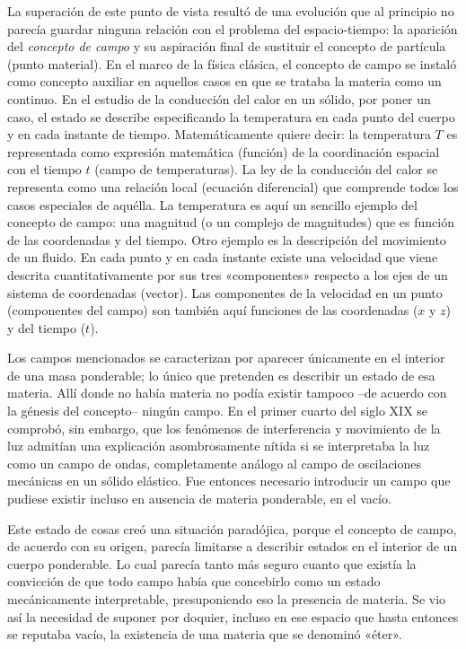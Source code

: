 \documentclass[spanish]{book}
\begin{document}
La superación de este punto de vista resultó de una evolución que al principio no
parecía guardar ninguna relación con el problema del espacio-tiempo: la aparición del
\textit{concepto de campo} y su aspiración final de sustituir el concepto de partícula (punto
material). En el marco de la física clásica, el concepto de campo se instaló como
concepto auxiliar en aquellos casos en que se trataba la materia como un continuo.
En el estudio de la conducción del calor en un sólido, por poner un caso, el estado se
describe especificando la temperatura en cada punto del cuerpo y en cada instante de
tiempo. Matemáticamente quiere decir: la temperatura $T$ es representada como
expresión matemática (función) de la coordinación espacial con el tiempo $t$ (campo de
temperaturas). La ley de la conducción del calor se representa como una relación local
(ecuación diferencial) que comprende todos los casos especiales de aquélla. La
temperatura es aquí un sencillo ejemplo del concepto de campo: una magnitud (o un
complejo de magnitudes) que es función de las coordenadas y del tiempo. Otro
ejemplo es la descripción del movimiento de un fluido. En cada punto y en cada
instante existe una velocidad que viene descrita cuantitativamente por sus tres
«componentes» respecto a los ejes de un sistema de coordenadas (vector). Las
componentes de la velocidad en un punto (componentes del campo) son también
aquí funciones de las coordenadas ($x$ y $z$) y del tiempo ($t$).

Los campos mencionados se caracterizan por aparecer únicamente en el interior de
una masa ponderable; lo único que pretenden es describir un estado de esa materia.
Allí donde no había materia no podía existir tampoco --de acuerdo con la génesis del
concepto-- ningún campo. En el primer cuarto del siglo XIX se comprobó, sin
embargo, que los fenómenos de interferencia y movimiento de la luz admitían una
explicación asombrosamente nítida si se interpretaba la luz como un campo de
ondas, completamente análogo al campo de oscilaciones mecánicas en un sólido
elástico. Fue entonces necesario introducir un campo que pudiese existir incluso en
ausencia de materia ponderable, en el vacío.

Este estado de cosas creó una situación paradójica, porque el concepto de campo,
de acuerdo con su origen, parecía limitarse a describir estados en el interior de un
cuerpo ponderable. Lo cual parecía tanto más seguro cuanto que existía la convicción
de que todo campo había que concebirlo como un estado mecánicamente
interpretable, presuponiendo eso la presencia de materia. Se vio así la necesidad de
suponer por doquier, incluso en ese espacio que hasta entonces se reputaba vacío, la
existencia de una materia que se denominó «éter».
\end{document}
